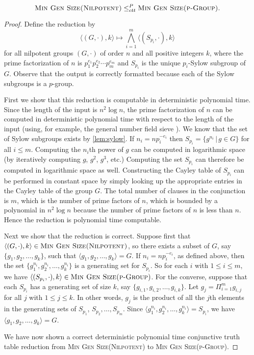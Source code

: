 \documentclass{article}
\newcommand{\gen}[1]{{\langle #1 \rangle}}
\begin{document}
\begin{proposition}
  \begin{equation*}
    \textsc{Min Gen Size(Nilpotent)} \leq_{ctt}^P \textsc{Min Gen Size(p-Group)}.
  \end{equation*}
\end{proposition}
\begin{proof}
  Define the reduction by
  \begin{equation*}
    \langle (G, \cdot), k \rangle \mapsto \bigwedge_{i=1}^m \langle (S_{p_i}, \cdot), k \rangle
  \end{equation*}
  for all nilpotent groups $(G, \cdot)$ of order $n$ and all positive integers $k$, where the prime factorization of $n$ is $p_1^{e_1}p_2^{e_2}\dotsb p_m^{e_m}$ and $S_{p_i}$ is the unique $p_i$-Sylow subgroup of $G$.
  Observe that the output is correctly formatted because each of the Sylow subgroups is a $p$-group.

  First we show that this reduction is computable in deterministic polynomial time.
  Since the length of the input is $n^2 \log n$, the prime factorization of $n$ can be computed in deterministic polynomial time with respect to the length of the input (using, for example, the general number field sieve \cite{llmp93}).
  We know that the set of Sylow subgroups exists by \autoref{lem:sylow}.
  If $n_i = n p_i^{-e_i}$ then $S_{p_i} = \{g^{n_i} \, | \, g \in G\}$ for all $i \leq m$.
  Computing the $n_i$th power of $g$ can be computed in logarithmic space (by iteratively computing $g$, $g^2$, $g^3$, etc.)
  Computing the set $S_{p_i}$ can therefore be computed in logarithmic space as well.
  Constructing the Cayley table of $S_{p_i}$ can be performed in constant space by simply looking up the appropriate entries in the Cayley table of the group $G$.
  The total number of clauses in the conjunction is $m$, which is the number of prime factors of $n$, which is bounded by a polynomial in $n^2 \log n$ because the number of prime factors of $n$ is less than $n$.
  Hence the reduction is polynomial time computable.

  Next we show that the reduction is correct.
  Suppose first that $\langle (G, \cdot), k \rangle \in \textsc{Min Gen Size(Nilpotent)}$, so there exists a subset of $G$, say $\{g_1, g_2, \dotsc, g_k\}$, such that $\gen{g_1, g_2, \dotsc, g_k} = G$.
  If $n_i = n p_i^{-e_i}$, as defined above, then the set $\{g_1^{n_i}, g_2^{n_i}, \dotsc, g_k^{n_i} \}$ is a generating set for $S_{p_i}$.
  So for each $i$ with $1 \leq i \leq m$, we have $\langle (S_{p_i}, \cdot), k \rangle \in \textsc{Min Gen Size(p-Group)}$.
  For the converse, suppose that each $S_{p_i}$ has a generating set of size $k$, say $\{g_{i, 1}, g_{i, 2}, \dotsc, g_{i, k}\}$.
  Let $g_j = \Pi_{i = 1}^m g_{i, j}$ for all $j$ with $1 \leq j \leq k$.
  In other words, $g_j$ is the product of all the $j$th elements in the generating sets of $S_{p_1}$, $S_{p_2}, \dotsc, S_{p_m}$.
  Since $\gen{g_1^{n_i}, g_2^{n_i}, \dotsc, g_k^{n_i}} = S_{p_i} $, we have $\gen{g_1, g_2, \dotsc, g_k} = G$.

  We have now shown a correct deterministic polynomial time conjunctive truth table reduction from \textsc{Min Gen Size(Nilpotent)} to \textsc{Min Gen Size(p-Group)}.
\end{proof}
\end{document}
